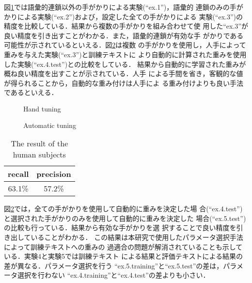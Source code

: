 図\ref{fig:handm}では語彙的連鎖以外の手がかりによる実験(``ex.1'')，語彙的
連鎖のみの手がかりによる実験(``ex.2'')および，設定した全ての手がかりによる
実験(``ex.3'')の精度を比較している．結果から複数の手がかりを組み合わせて使
用した``ex.3''が良い精度を引き出すことがわかる．また，語彙的連鎖が有効な手
がかりである可能性が示されているといえる．図\ref{fig:regressm}は複数
の手がかりを使用し，人手によって重みを与えた実験(``ex.3'')と訓練テキストに
より自動的に計算された重みを使用した実験(``ex.4.test'')との比較をしている．
結果から自動的に学習された重みが概ね良い精度を出すことが示されている．人手
による手間を省き，客観的な値が得られることから，自動的な重み付けは人手によ
る重み付けよりも良い手法であるといえる．

\begin{figure}[htbp]
\begin{center}
\caption{\vspace*{-3mm}Hand tuning}
\label{fig:handm}
\end{center}
\end{figure}

\begin{figure}[htbp]
\begin{center}
\caption{\vspace{-3mm}Automatic tuning}
\label{fig:regressm}
\end{center}
\end{figure}

\begin{table}[ht]
\begin{center}
\caption{The result of the human subjects}
\begin{tabular}{|c|c|}\hline
recall & precision \\\hline\hline
63.1\% & 57.2\%\\\hline
\end{tabular}
\label{tab:human}
\end{center}
\end{table}

図\ref{fig:regressm}では，全ての手がかりを使用して自動的に重みを決定した場
合(``ex.4.test'')と選択された手がかりのみを使用して自動的に重みを決定した
場合(``ex.5.test'')の比較も行っている．結果から有効な手がかりを選
択することで良い精度を引き出していることがわかる．
この結果は本研究で使用したパラメータ選択手法によって訓練テキストへの重みの
過適合の問題が解消されていることも示している．実験4と実験5では訓練テキスト
による結果と評価テキストによる結果の差が異なる．パラメータ選択を行う
``ex.5.training''と``ex.5.test''の差は，パラメータ選択を行わない
``ex.4.training''と``ex.4.test''の差よりも小さい．

